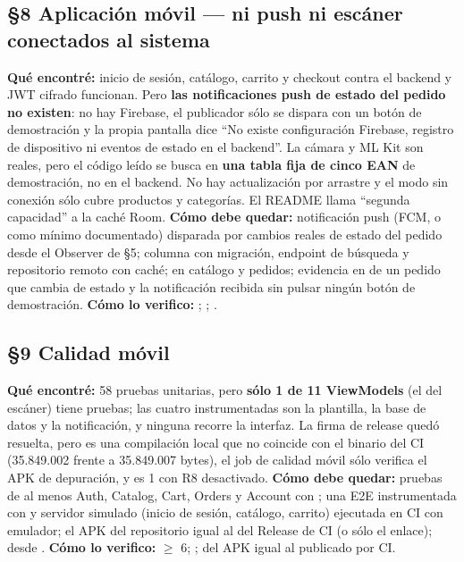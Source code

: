 \subsection*{\S8 Aplicaci\'on m\'ovil --- ni push ni esc\'aner conectados al sistema}
\textbf{Qu\'e encontr\'e:} inicio de sesi\'on, cat\'alogo, carrito y checkout contra el backend y JWT cifrado funcionan. Pero \textbf{las notificaciones push de estado del pedido no existen}: no hay Firebase, el publicador s\'olo se dispara con un bot\'on de demostraci\'on y la propia pantalla dice ``No existe configuraci\'on Firebase, registro de dispositivo ni eventos de estado en el backend''. La c\'amara y ML Kit son reales, pero el c\'odigo le\'ido se busca en \textbf{una tabla fija de cinco EAN} de demostraci\'on, no en el backend. No hay actualizaci\'on por arrastre y el modo sin conexi\'on s\'olo cubre productos y categor\'ias. El README llama ``segunda capacidad'' a la cach\'e Room. \textbf{C\'omo debe quedar:} notificaci\'on push (FCM, o como m\'inimo  documentado) disparada por cambios reales de estado del pedido desde el Observer de \S5; columna  con migraci\'on, endpoint de b\'usqueda y repositorio remoto con cach\'e;  en cat\'alogo y pedidos; evidencia en  de un pedido que cambia de estado y la notificaci\'on recibida sin pulsar ning\'un bot\'on de demostraci\'on. \textbf{C\'omo lo verifico:} ; ; .

\subsection*{\S9 Calidad m\'ovil}
\textbf{Qu\'e encontr\'e:} 58 pruebas unitarias, pero \textbf{s\'olo 1 de 11 ViewModels} (el del esc\'aner) tiene pruebas; las cuatro instrumentadas son la plantilla, la base de datos y la notificaci\'on, y ninguna recorre la interfaz. La firma de release qued\'o resuelta, pero  es una compilaci\'on local que no coincide con el binario del CI (35.849.002 frente a 35.849.007 bytes), el job de calidad m\'ovil s\'olo verifica el APK de depuraci\'on, y  es 1 con R8 desactivado. \textbf{C\'omo debe quedar:} pruebas de al menos Auth, Catalog, Cart, Orders y Account con ; una E2E instrumentada con  y servidor simulado (inicio de sesi\'on, cat\'alogo, carrito) ejecutada en CI con emulador; el APK del repositorio igual al del Release de CI (o s\'olo el enlace);  desde . \textbf{C\'omo lo verifico:}  $\ge$ 6; ;  del APK igual al publicado por CI.

